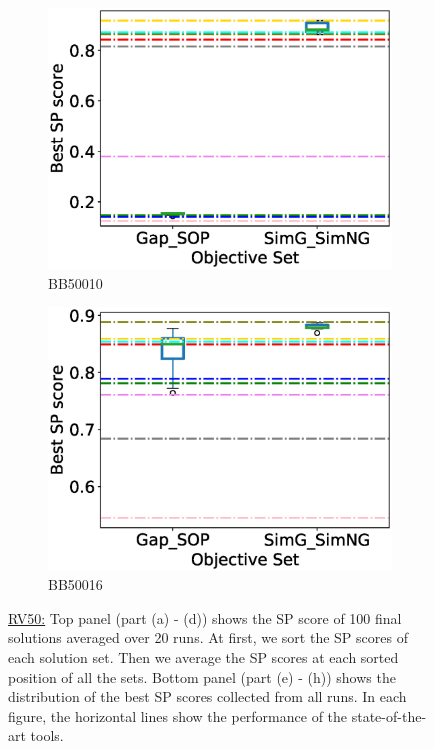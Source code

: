 \begin{figure}[!htbp]
\begin{adjustwidth}{-1cm}{-1cm}
\begin{subfigure}{0.22\textwidth}
			\includegraphics[width=\columnwidth]{Figure/summary/precomputedInit/Balibase/BB50010_objset_pairs_rank_2}
			\caption{BB50010}
		\end{subfigure}
		\begin{subfigure}{0.22\textwidth}
			\includegraphics[width=\columnwidth]{Figure/summary/precomputedInit/Balibase/BB50016_objset_pairs_rank_2}
			\caption{BB50016}
		\end{subfigure}
		\caption{\underline{RV50:} Top panel (part (a) - (d)) shows the SP score of 100 final solutions averaged over 20 runs. At first, we sort the SP scores of each solution set. Then we average the SP scores at each sorted position of all the sets. Bottom panel (part (e) - (h)) shows the distribution of the best SP scores collected from all runs. In each figure, the horizontal lines show the performance of the state-of-the-art tools.}
		\label{fig:rv50_sp}
	\end{adjustwidth}
\end{figure}

